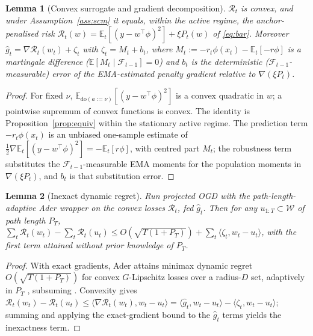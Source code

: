 \documentclass[authoryear,preprint,12pt]{elsarticle}
\theoremstyle{plain}
\newtheorem{lemma}{Lemma}
\theoremstyle{remark}
\newcommand{\E}{\mathbb{E}}
\newcommand{\doop}{\mathrm{do}}
\begin{document}
\begin{lemma}[Convex surrogate and gradient decomposition]\label{lem:surrogate}
$\mathcal{R}_t$ is convex, and under Assumption~\ref{ass:scm} it equals, within the active
regime, the anchor-penalised risk $\mathcal{R}_t(w)=\E_t[(y-w^\top\phi)^2]+\xi P_t(w)$ of
\eqref{eq:bar}. Moreover $\hat g_t=\nabla\mathcal{R}_t(w_t)+\zeta_t$ with $\zeta_t=M_t+b_t$,
where $M_t:=-r_t\phi(x_t)-\E_t[-r\phi]$ is a martingale difference
($\E[M_t\mid\mathcal F_{t-1}]=0$) and $b_t$ is the deterministic
($\mathcal F_{t-1}$-measurable) error of the EMA-estimated penalty gradient relative to
$\nabla(\xi P_t)$.
\end{lemma}
\begin{proof}
For fixed $\nu$, $\E_{\doop(a:=\nu)}[(y-w^\top\phi)^2]$ is a convex quadratic in $w$; a
pointwise supremum of convex functions is convex. The identity is
Proposition~\ref{prop:equiv} within the stationary active regime. The prediction term
$-r_t\phi(x_t)$ is an unbiased one-sample estimate of
$\tfrac12\nabla\E_t[(y-w^\top\phi)^2]=-\E_t[r\phi]$, with centred part $M_t$; the
robustness term substitutes the $\mathcal F_{t-1}$-measurable EMA moments for the
population moments in $\nabla(\xi P_t)$, and $b_t$ is that substitution error.
\end{proof}

\begin{lemma}[Inexact dynamic regret]\label{lem:ogd}
Run projected OGD with the path-length-adaptive Ader wrapper
\citep{zhang2018adaptive} on the convex losses $\mathcal{R}_t$, fed $\hat g_t$. Then for any
$u_{1:T}\subset\mathcal{W}$ of path length $P_T$,
$\sum_t\mathcal{R}_t(w_t)-\sum_t\mathcal{R}_t(u_t)\le O(\sqrt{T(1+P_T)})+\sum_t\langle\zeta_t,
w_t-u_t\rangle$, with the first term attained without prior knowledge of $P_T$.
\end{lemma}
\begin{proof}
With exact gradients, Ader attains minimax dynamic regret $O(\sqrt{T(1+P_T)})$ for
convex $G$-Lipschitz losses over a radius-$D$ set, adaptively in $P_T$
\citep{zhang2018adaptive}, subsuming \citet{zinkevich2003ogd,hazan2016oco}. Convexity
gives $\mathcal{R}_t(w_t)-\mathcal{R}_t(u_t)\le\langle\nabla\mathcal{R}_t(w_t),w_t-u_t\rangle=
\langle\hat g_t,w_t-u_t\rangle-\langle\zeta_t,w_t-u_t\rangle$; summing and applying the
exact-gradient bound to the $\hat g_t$ terms yields the inexactness term.
\end{proof}
\end{document}
